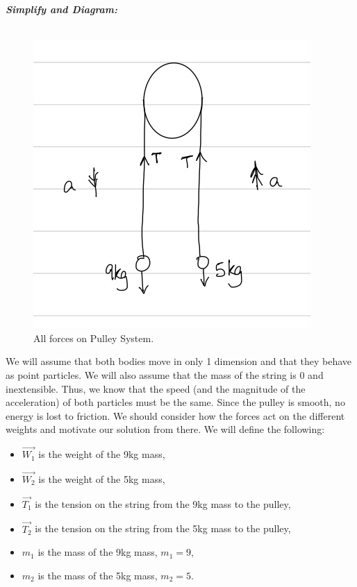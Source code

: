 \begin{subquestions}
\begin{subsubquestions}
\textbf{\textit{Simplify and Diagram:}} \\ \\
\begin{figure}[H]
	\begin{center}
		\includegraphics[scale=0.25]{../2013/figures/2013q6-1}
		\caption{\label{2013:q6:Diagram1} All forces on Pulley System.}
	\end{center}
\end{figure}
We will assume that both bodies move in only 1 dimension and that they behave as point particles. We will also assume that the mass of the string is 0 and inextensible. Thus, we know that the speed (and the magnitude of the acceleration) of both particles must be the same. Since the pulley is smooth, no energy is lost to friction. We should consider how the forces act on the different weights and motivate our solution from there.
We will define the following:
\begin{itemize}
	\item $\vec{W_1}$ is the weight of the 9kg mass,
	\item $\vec{W_2}$ is the weight of the 5kg mass,
	\item $\vec{T_1}$ is the tension on the string from the 9kg mass to the pulley,
	\item $\vec{T_2}$ is the tension on the string from the 5kg mass to the pulley,
	\item $m_1$ is the mass of the 9kg mass, $m_1=9$,
	\item $m_2$ is the mass of the 5kg mass, $m_2=5$.
\end{itemize}




\end{subsubquestions}
\end{subquestions}
